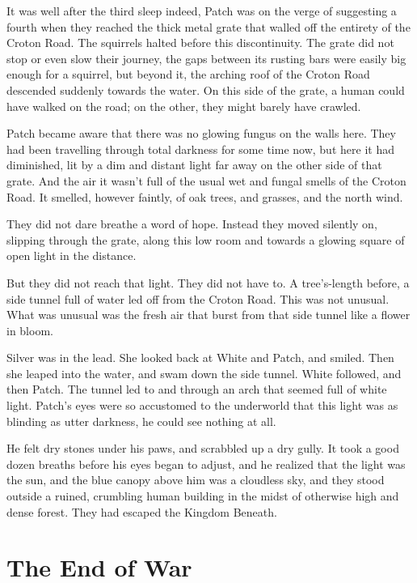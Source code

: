 \documentclass[12pt]{book}
\begin{document}
It was well after the third sleep %
indeed, Patch was on the verge of suggesting a fourth %
when they reached the thick metal grate that walled off the entirety of the Croton Road. The squirrels halted before this discontinuity. The grate did not stop or even slow their journey, the gaps between its rusting bars were easily big enough for a squirrel, but beyond it, the arching roof of the Croton Road descended suddenly towards the water. On this side of the grate, a human could have walked on the road; on the other, they might barely have crawled.

Patch became aware that there was no glowing fungus on the walls here. They had been travelling through total darkness for some time now, but here it had diminished, lit by a dim and distant light far away on the other side of that grate. And the air %
it wasn't full of the usual wet and fungal smells of the Croton Road. It smelled, however faintly, of oak trees, and grasses, and the north wind.

They did not dare breathe a word of hope. Instead they moved silently on, slipping through the grate, along this low room %
and towards a glowing square of open light in the distance.

But they did not reach that light. They did not have to. A tree's-length before, a side tunnel full of water led off from the Croton Road. This was not unusual. What was unusual was the fresh air that burst from that side tunnel like a flower in bloom.

Silver was in the lead. She looked back at White and Patch, and smiled. Then she leaped into the water, and swam down the side tunnel. White followed, and then Patch. The tunnel led to and through an arch that seemed full of white light. Patch's eyes were so accustomed to the underworld that this light was as blinding as utter darkness, he could see nothing at all.

He felt dry stones under his paws, and scrabbled up a dry gully. It took a good dozen breaths before his eyes began to adjust, and he realized that the light was the sun, and the blue canopy above him was a cloudless sky, and they stood outside a ruined, crumbling human building in the midst of otherwise high and dense forest. They had escaped the Kingdom Beneath.


\chapter{The End of War}
\end{document}

